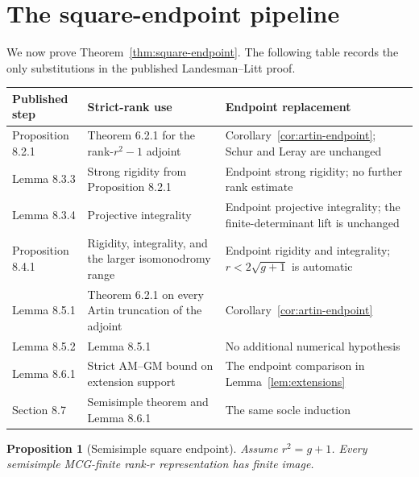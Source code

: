 \documentclass[11pt]{article}
\newtheorem{proposition}[theorem]{Proposition}
\theoremstyle{definition}
\begin{document}
\section{The square-endpoint pipeline}\label{sec:pipeline}

We now prove Theorem~\ref{thm:square-endpoint}.  The following table records the
only substitutions in the published Landesman--Litt proof.

\begin{center}
\small
\begin{tabular}{>{\raggedright\arraybackslash}p{}
                >{\raggedright\arraybackslash}p{}
                >{\raggedright\arraybackslash}p{}}
\toprule
Published step & Strict-rank use & Endpoint replacement\\
\midrule
Proposition 8.2.1 & Theorem 6.2.1 for the rank-$r^2-1$ adjoint &
Corollary~\ref{cor:artin-endpoint}; Schur and Leray are unchanged\\
Lemma 8.3.3 & Strong rigidity from Proposition 8.2.1 &
Endpoint strong rigidity; no further rank estimate\\
Lemma 8.3.4 & Projective integrality &
Endpoint projective integrality; the finite-determinant lift is unchanged\\
Proposition 8.4.1 & Rigidity, integrality, and the larger isomonodromy range &
Endpoint rigidity and integrality; $r<2\sqrt{g+1}$ is automatic\\
Lemma 8.5.1 & Theorem 6.2.1 on every Artin truncation of the adjoint &
Corollary~\ref{cor:artin-endpoint}\\
Lemma 8.5.2 & Lemma 8.5.1 & No additional numerical hypothesis\\
Lemma 8.6.1 & Strict AM--GM bound on extension support &
The endpoint comparison in Lemma~\ref{lem:extensions}\\
Section 8.7 & Semisimple theorem and Lemma 8.6.1 &
The same socle induction\\
\bottomrule
\end{tabular}
\end{center}

\begin{proposition}[Semisimple square endpoint]
\label{prop:semisimple}
Assume $r^2=g+1$.  Every semisimple MCG-finite rank-$r$ representation has
finite image.
\end{proposition}
\end{document}
